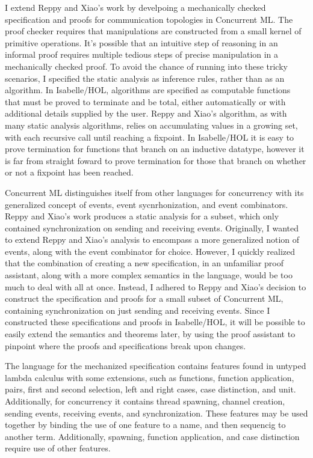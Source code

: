 \documentclass[letterpaper, 11pt]{extarticle}
\begin{document}
I extend Reppy and Xiao's work by develpoing a mechanically checked specification and proofs
for communication topologies in Concurrent ML. The proof checker requires that manipulations are
constructed from a small kernel of primitive operations. It's possible that an intuitive step of reasoning in an
informal proof requires multiple tedious steps of precise manipulation in a mechanically checked proof.
To avoid the chance of running into these tricky scenarios, I specified the static analysis
as inference rules, rather than as an algorithm. In Isabelle/HOL, algorithms are specified as computable functions
that must be proved to terminate and be total, either automatically or with additional details supplied by the user.
Reppy and Xiao's algorithm, as with many static analysis algorithms, relies on accumulating values in a growing set,
with each recursive call until reaching a fixpoint.
In Isabelle/HOL it is easy to prove termination for functions that branch on an inductive datatype, 
however it is far from straight foward to prove termination for those that branch on
whether or not a fixpoint has been reached.

Concurrent ML distinguishes itself from other languages for concurrency with its generalized concept of events,
event sycnrhonization, and event combinators. Reppy and Xiao's work produces a static analysis for a subset,
which only contained synchronization on sending and receiving events. Originally, I wanted to extend Reppy and Xiao's
analysis to encompass a more generalized notion of events, along with the event combinator for choice.
However, I quickly
realized that the combination of creating a new specification, in an unfamiliar proof assistant, along with a more complex
semantics in the language, would be too much to deal with all at once. Instead, I adhered to Reppy and Xiao's decision
to construct the specification and proofs for a small subset of Concurrent ML, containing synchronization on just
sending and receiving events. Since I constructed these specifications and proofs in Isabelle/HOL, it will be possible
to easily extend the semantics and theorems later, by using the proof assistant to pinpoint where the proofs and
specifications break upon changes.

The language for the mechanized specification contains features found in untyped lambda calculus with
some extensions, such as functions, function application, pairs, first and second selection, left and right cases, case distinction, 
and unit. 
Additionally, for concurrency it contains thread spawning, channel creation, sending events, receiving events, and synchronization.
These features may be used together by binding the use of one feature to a name, and then
sequencig to another term. Additionally, spawning, function application, and case distinction require use of other features.
\end{document}
